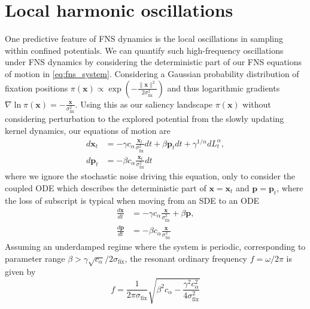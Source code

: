 \section{Local harmonic oscillations}\label{sec:local_harmonic_oscillations}
One predictive feature of FNS dynamics is the local oscillations in sampling within confined potentials. We can quantify such high-frequency oscillations under FNS dynamics by considering the deterministic part of our FNS equations of motion in \cref{eq:fns_system}. Considering a Gaussian probability distribution of fixation positions $\pi(\textbf{x}) \propto \exp \left( - \frac{\| \textbf{x} \|^2}{2 \sigma_{\text{fix}}^2} \right)$ and thus logarithmic gradients $\nabla \ln \pi(\textbf{x}) = -\frac{\textbf{x}}{\sigma_{\text{fix}}^2}$. Using this as our saliency landscape $\pi(\textbf{x})$ without considering perturbation to the explored potential from the slowly updating kernel dynamics, our equations of motion are
\begin{equation}
\begin{aligned}
    d\textbf{x}_t &= -\gamma c_{\alpha} \frac{\textbf{x}_t}{\sigma_{\text{fix}}^2} dt + \beta \textbf{p}_t dt + \gamma^{1/\alpha} dL_t^{\alpha}, \\
    d\textbf{p}_t &= -\beta c_{\alpha} \frac{\textbf{x}_t}{\sigma_{\text{fix}}^2} dt
\end{aligned}
\end{equation}
where we ignore the stochastic noise driving this equation, only to consider the coupled ODE which describes the deterministic part of $\textbf{x} = \textbf{x}_t$ and $ \textbf{p} = \textbf{p}_t$, where the loss of subscript is typical when moving from an SDE to an ODE
\begin{equation}
\begin{aligned}
    \frac{d \textbf{x}}{dt} &= -\gamma c_{\alpha} \frac{\textbf{x}}{\sigma_{\text{fix}}^2} + \beta \textbf{p}, \\
    \frac{d\textbf{p}}{dt} &= -\beta c_{\alpha} \frac{\textbf{x}}{\sigma_{\text{fix}}^2} 
\end{aligned}
\end{equation}
Assuming an underdamped regime where the system is periodic, corresponding to parameter range $\beta > \gamma \sqrt{c_{\alpha}} / 2 \sigma_{\text{fix}}$, the resonant ordinary frequency $f = \omega / 2 \pi$ is given by
\begin{equation}\label{eq:resonant_frequency}
    f = \frac{1}{2 \pi \sigma_{\text{fix}}} \sqrt{\beta^2 c_{\alpha} - \frac{\gamma^2 c_{\alpha}^2}{4\sigma_{\text{fix}}^2}}
\end{equation}
